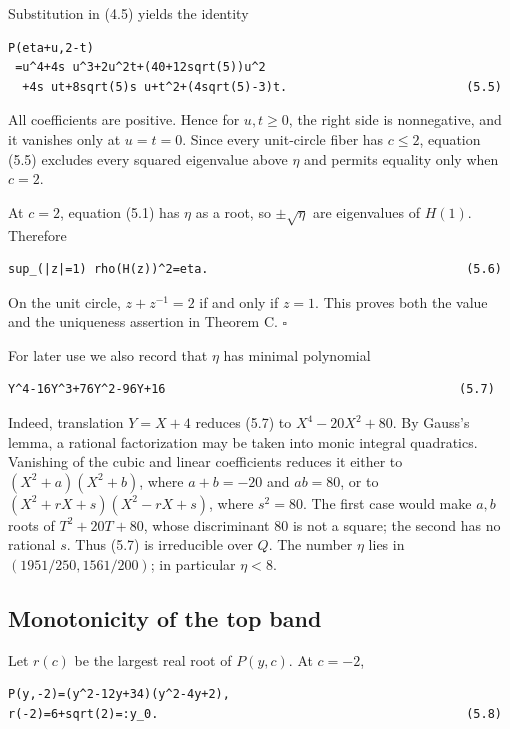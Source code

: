 Substitution in (4.5) yields the identity

\begin{lstlisting}[language={}]
P(eta+u,2-t)
 =u^4+4s u^3+2u^2t+(40+12sqrt(5))u^2
  +4s ut+8sqrt(5)s u+t^2+(4sqrt(5)-3)t.                         (5.5)
\end{lstlisting}

All coefficients are positive. Hence for \(u,t\ge 0\), the right side is
nonnegative, and it vanishes only at \(u=t=0\). Since every unit-circle fiber
has \(c\le 2\), equation (5.5) excludes every squared eigenvalue above \(\eta\) and
permits equality only when \(c=2\).

At \(c=2\), equation (5.1) has \(\eta\) as a root, so \(\pm \sqrt{\eta}\) are eigenvalues
of \(H(1)\). Therefore

\begin{lstlisting}[language={}]
sup_(|z|=1) rho(H(z))^2=eta.                                    (5.6)
\end{lstlisting}

On the unit circle, \(z+z^{-1}=2\) if and only if \(z=1\). This proves both the
value and the uniqueness assertion in Theorem C. \(\square\)

For later use we also record that \(\eta\) has minimal polynomial

\begin{lstlisting}[language={}]
Y^4-16Y^3+76Y^2-96Y+16                                         (5.7)
\end{lstlisting}

Indeed, translation \(Y=X+4\) reduces (5.7) to
\(X^4-20X^2+80\). By Gauss's lemma, a rational factorization may be taken into
monic integral quadratics. Vanishing of the cubic and linear coefficients
reduces it either to \((X^2+a)(X^2+b)\), where
\(a+b=-20\) and \(ab=80\), or to
\((X^2+rX+s)(X^2-rX+s)\), where \(s^2=80\). The first case would make \(a,b\)
roots of \(T^2+20T+80\), whose discriminant 80 is not a square; the second has
no rational \(s\). Thus (5.7) is irreducible over \(Q\). The number \(\eta\) lies in
\((1951/250,1561/200)\); in particular \(\eta<8\).

\subsection{Monotonicity of the top band}

Let \(r(c)\) be the largest real root of \(P(y,c)\). At \(c=-2\),

\begin{lstlisting}[language={}]
P(y,-2)=(y^2-12y+34)(y^2-4y+2),
r(-2)=6+sqrt(2)=:y_0.                                           (5.8)
\end{lstlisting}

